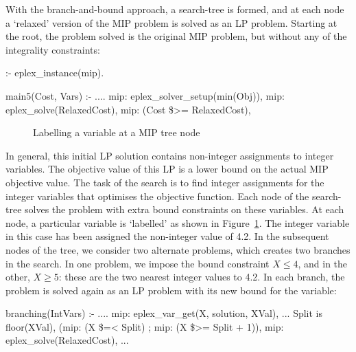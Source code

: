 With the branch-and-bound approach, a search-tree is formed, and at each node a
`relaxed' version of the MIP problem is solved as an LP problem.
Starting at the root, the problem solved is the original MIP problem, but
without any of the integrality constraints:
{\small
\begin{code}
:- eplex_instance(mip).

main5(Cost, Vars) :-
      ....
      mip: eplex_solver_setup(min(Obj)), 
      mip: eplex_solve(RelaxedCost),
      mip: (Cost \$>= RelaxedCost),  %
\end{code}}
\begin{figure}
\begin{center}
\end{center}
\caption{Labelling a variable at a MIP tree node}
\label{mipnode}
\end{figure}
In general, this initial LP solution contains non-integer assignments
to integer variables. The objective value of this LP is a lower bound on
the actual MIP objective value.
The task of the search is to find integer assignments
for the integer variables that optimises the objective function. 
Each node of the
search-tree solves the problem with extra bound constraints on these
variables. At each node, a particular variable is `labelled' as shown in
Figure~\ref{mipnode}. The integer variable in this case has been assigned
the non-integer value of 4.2. In the subsequent nodes of the tree, we
consider two  alternate problems, which creates two branches in the search. In one
problem, we impose the bound constraint $X \leq 4$, and in the other, $X
\geq 5$: these are the two nearest integer values to 4.2. In each branch,
the problem is  solved
again as an LP problem with its new bound for the variable:

{\small
\begin{code}
branching(IntVars) :-
      ....
      mip: eplex_var_get(X, solution, XVal),
      ...
      Split is floor(XVal),
      (mip: (X \$=< Split) ; mip: (X \$>= Split + 1)),
      mip: eplex_solve(RelaxedCost),
      ...%
\end{code}}

